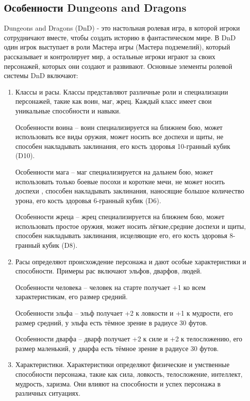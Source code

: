 \subsection{Особенности Dungeons and Dragons}
Dungeons and Dragons (DnD) - это настольная ролевая игра, в которой игроки сотрудничают вместе, чтобы создать историю в фантастическом мире. В DnD один игрок выступает в роли Мастера игры (Мастера подземелий), который рассказывает и контролирует мир, а остальные игроки играют за своих персонажей, которых они создают и развивают.
Основные элементы ролевой системы DnD включают:
	\begin{enumerate} 
		\item Классы и расы. Классы представляют различные роли и специализации персонажей, такие как воин, маг, жрец. Каждый класс имеет свои уникальные способности и навыки.
			
				Особенности воина -- воин специализируется на ближнем бою, может использовать все виды оружия, может носить все доспехи и щиты, не способен накладывать заклинания, его кость здоровья 10-гранный кубик (D10).
				
				 Особенности мага -- маг специализируется на дальнем бою, может использовать только боевые посохи и короткие мечи, не может носить доспехи , способен накладывать заклинания, наносящие большое количество урона, его кость здоровья 6-гранный кубик (D6).
				 
				Особенности жреца -- жрец специализируется на ближнем бою, может использовать простое оружия, может носить лёгкие,средние доспехи и щиты, способен накладывать заклинания, исцеляющие его, его кость здоровья 8-гранный кубик (D8).
			
		\item Расы определяют происхождение персонажа и дают особые характеристики и способности. Примеры рас включают эльфов, дварфов, людей.
			
			 Особенности человека -- человек на старте получает +1 ко всем характеристикам, его размер средний.
			 
			 Особенности эльфа -- эльф получает +2 к ловкости и +1 к мудрости, его размер средний, у эльфа есть тёмное зрение в радиусе 30 футов.
			 
			 Особенности дварфа -- дварф получает +2 к силе и +2 к телосложению, его размер маленький, у дварфа есть тёмное зрение в радиусе 30 футов.
		
		\item Характеристики.
			Характеристики определяют физические и умственные способности персонажа, такие как сила, ловкость, телосложение, интеллект, мудрость, харизма. Они влияют на способности и успех персонажа в различных ситуациях.
			

\end{enumerate}
